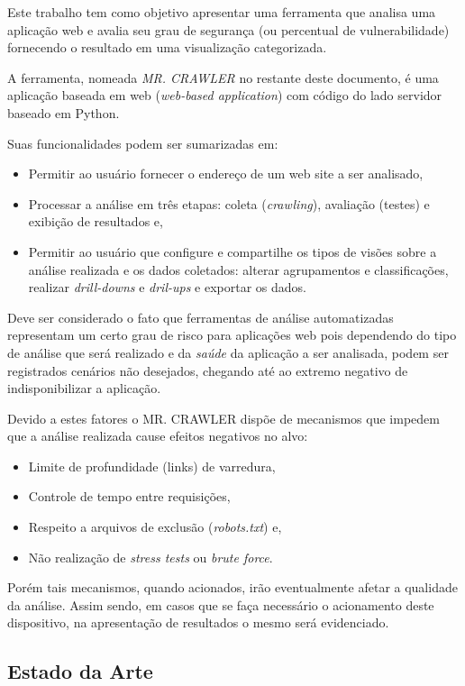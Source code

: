 ﻿\documentclass[twocolumn,showpacs,%
  nofootinbib,aps,superscriptaddress,%
  eqsecnum,prd,notitlepage,showkeys,10pt]{revtex4-1}
\begin{document}
Este trabalho tem como objetivo apresentar uma ferramenta que analisa uma aplicação web e avalia seu grau de segurança (ou percentual de vulnerabilidade) fornecendo o resultado em uma visualização categorizada.

A ferramenta, nomeada \emph{MR. CRAWLER} no restante deste documento, é uma aplicação baseada em web (\emph{web-based application}) com código do lado servidor baseado em Python.

Suas funcionalidades podem ser sumarizadas em:

\begin{itemize}
\item Permitir ao usuário fornecer o endereço de um web site a ser analisado,
\item Processar a análise em três etapas: coleta (\emph{crawling}), avaliação (testes) e exibição de resultados e,
\item Permitir ao usuário que configure e compartilhe os tipos de visões sobre a análise realizada e os dados coletados: alterar agrupamentos e classificações, realizar \emph{drill-downs} e \emph{dril-ups} e exportar os dados.
\end{itemize}

Deve ser considerado o fato que ferramentas de análise automatizadas representam um certo grau de risco para aplicações web pois dependendo do tipo de análise que será realizado e da \emph{saúde} da aplicação a ser analisada, podem ser registrados cenários não desejados, chegando até ao extremo negativo de indisponibilizar a aplicação.

Devido a estes fatores o MR. CRAWLER dispõe de mecanismos que impedem que a análise realizada cause efeitos negativos no alvo:

\begin{itemize}
\item Limite de profundidade (links) de varredura,
\item Controle de tempo entre requisições,
\item Respeito a arquivos de exclusão (\emph{robots.txt}) e,
\item Não realização de \emph{stress tests} ou \emph{brute force}.
\end{itemize}

Porém tais mecanismos, quando acionados, irão eventualmente afetar a qualidade da análise. Assim sendo, em casos que se faça necessário o acionamento deste dispositivo, na apresentação de resultados o mesmo será evidenciado.

\subsection{Estado da Arte}
\end{document}
